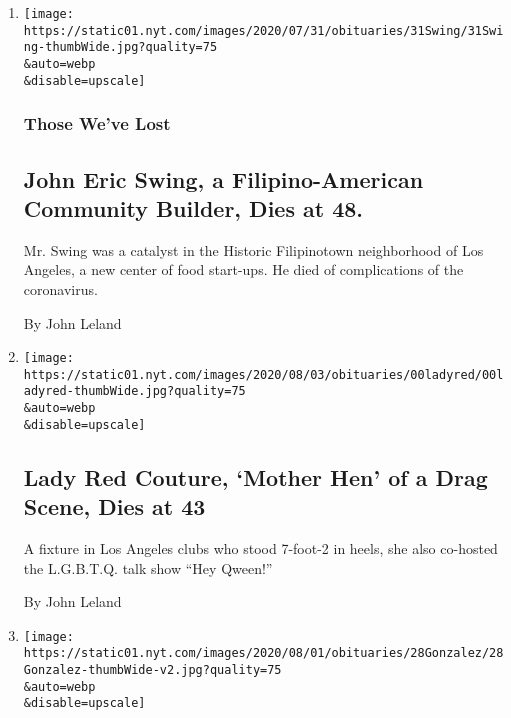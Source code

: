 \begin{enumerate}
\def\labelenumi{\arabic{enumi}.}
\item
  \href{/2020/08/03/obituaries/john-swing-dead-coronavirus.html}{}

  \texttt{[image: https://static01.nyt.com/images/2020/07/31/obituaries/31Swing/31Swing-thumbWide.jpg?quality=75\\\&auto=webp\\\&disable=upscale]}

  \hypertarget{those-weve-lost}{%
  \subsubsection{Those We've Lost}\label{those-weve-lost}}

  \hypertarget{john-eric-swing-a-filipino-american-community-builder-dies-at-48}{%
  \subsection{John Eric Swing, a Filipino-American Community Builder,
  Dies at
  48.}\label{john-eric-swing-a-filipino-american-community-builder-dies-at-48}}

  Mr. Swing was a catalyst in the Historic Filipinotown neighborhood of
  Los Angeles, a new center of food start-ups. He died of complications
  of the coronavirus.

  By John Leland
\item
  \href{/2020/08/01/arts/lady-red-couture-dead.html}{}

  \texttt{[image: https://static01.nyt.com/images/2020/08/03/obituaries/00ladyred/00ladyred-thumbWide.jpg?quality=75\\\&auto=webp\\\&disable=upscale]}

  \hypertarget{lady-red-couture-mother-hen-of-a-drag-scene-dies-at-43}{%
  \subsection{Lady Red Couture, `Mother Hen' of a Drag Scene, Dies at
  43}\label{lady-red-couture-mother-hen-of-a-drag-scene-dies-at-43}}

  A fixture in Los Angeles clubs who stood 7-foot-2 in heels, she also
  co-hosted the L.G.B.T.Q. talk show ``Hey Qween!''

  By John Leland
\item
  \href{/2020/07/30/obituaries/waldemar-gonzalez-dead-coronavirus.html}{}

  \texttt{[image: https://static01.nyt.com/images/2020/08/01/obituaries/28Gonzalez/28Gonzalez-thumbWide-v2.jpg?quality=75\\\&auto=webp\\\&disable=upscale]}


\end{enumerate}
